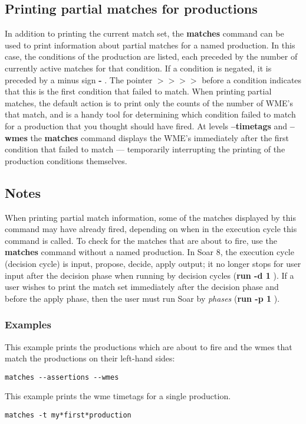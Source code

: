 \subsection*{Printing partial matches for productions}
 In addition to printing the current match set, the \textbf{matches}
 command can be used to print information about partial matches for a named production. In this case, the conditions of the production are listed, each preceded by the number of currently active matches for that condition. If a condition is negated, it is preceded by a minus sign \textbf{-}
. The pointer \textbf{$>$$>$$>$$>$}
 before a condition indicates that this is the first condition that failed to match. 
 When printing partial matches, the default action is to print only the counts of the number of WME's that match, and is a handy tool for determining which condition failed to match for a production that you thought should have fired. At levels \textbf{--timetags}
 and \textbf{--wmes}
 the \textbf{matches}
 command displays the WME's immediately after the first condition that failed to match --- temporarily interrupting the printing of the production conditions themselves. 
\subsection*{Notes}
 When printing partial match information, some of the matches displayed by this command may have already fired, depending on when in the execution cycle this command is called. To check for the matches that are about to fire, use the \textbf{matches}
 command without a named production. 
 In Soar 8, the execution cycle (decision cycle) is input, propose, decide, apply output; it no longer stops for user input after the decision phase when running by decision cycles (\textbf{run -d 1}
). If a user wishes to print the match set immediately after the decision phase and before the apply phase, then the user must run Soar by \emph{phases}
 (\textbf{run -p 1}
). 
\subsubsection*{Examples}
 This example prints the productions which are about to fire and the wmes that match the productions on their left-hand sides: \begin{verbatim}
matches --assertions --wmes
\end{verbatim}
 This example prints the wme timetags for a single production. \begin{verbatim}
matches -t my*first*production
\end{verbatim}
